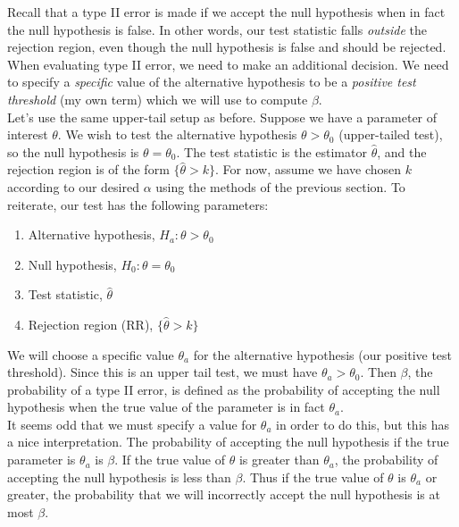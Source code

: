 \documentclass[notes.tex]{subfiles}
\begin{document}
Recall that a type II error is made if we accept the null hypothesis when in fact the null hypothesis is false. In other words, our test statistic falls \emph{outside} the rejection region, even though the null hypothesis is false and should be rejected. When evaluating type II error, we need to make an additional decision. We need to specify a \emph{specific} value of the alternative hypothesis to be a \emph{positive test threshold} (my own term) which we will use to compute $\beta$.\\

Let's use the same upper-tail setup as before. Suppose we have a parameter of interest $\theta$. We wish to test the alternative hypothesis $\theta > \theta_0$ (upper-tailed test), so the null hypothesis is $\theta = \theta_0$. The test statistic is the estimator $\hat{\theta}$, and the rejection region is of the form $\{\hat{\theta} > k\}$. For now, assume we have chosen $k$ according to our desired $\alpha$ using the methods of the previous section. To reiterate, our test has the following parameters:

\begin{enumerate}
\item Alternative hypothesis, $H_a: \theta > \theta_0$
\item Null hypothesis, $H_0: \theta = \theta_0$
\item Test statistic, $\hat{\theta}$
\item Rejection region (RR), $\{ \hat{\theta} > k \}$
\end{enumerate}

We will choose a specific value $\theta_a$ for the alternative hypothesis (our positive test threshold). Since this is an upper tail test, we must have $\theta_a > \theta_0$. Then $\beta$, the probability of a type II error, is defined as the probability of accepting the null hypothesis when the true value of the parameter is in fact $\theta_a$.\\

It seems odd that we must specify a value for $\theta_a$ in order to do this, but this has a nice interpretation. The probability of accepting the null hypothesis if the true parameter is $\theta_a$ is $\beta$. If the true value of $\theta$ is greater than $\theta_a$, the probability of accepting the null hypothesis is less than $\beta$. Thus if the true value of $\theta$ is $\theta_a$ or greater, the probability that we will incorrectly accept the null hypothesis is at most $\beta$.\\
\end{document}

